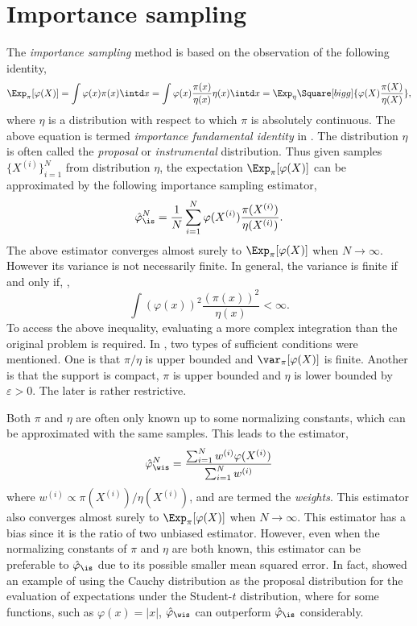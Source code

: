 \section{Importance sampling}
\label{sec:Importance sampling}

The \emph{importance sampling} method is based on the observation of the
following identity,
\begin{equation}
  \Exp_{\pi}[\varphi(X)]
  = \int\varphi(x)\pi(x)\intd x
  = \int\varphi(x)\frac{\pi(x)}{\eta(x)}\eta(x)\intd x
  = \Exp_{\eta}\Square[bigg]{\varphi(X)\frac{\pi(X)}{\eta(X)}},
  \label{eq:impotance fundamental}
\end{equation}
where $\eta$ is a distribution with respect to which $\pi$ is absolutely
continuous. The above equation is termed \emph{importance fundamental
  identity} in \cite{Robert:2004tn}. The distribution $\eta$ is often called
the \emph{proposal} or \emph{instrumental} distribution. Thus given \iid
samples $\{X^{(i)}\}_{i=1}^N$ from distribution $\eta$, the expectation
$\Exp_{\pi}[\varphi(X)]$ can be approximated by the following importance
sampling estimator,
\begin{equation}
  \hat\varphi_{\is}^N
  = \frac{1}{N}\sum_{i=1}^N\varphi(X^{(i)})\frac{\pi(X^{(i)})}{\eta(X^{(i)})}.
  \label{eq:is normalized}
\end{equation}
The above estimator converges almost surely to $\Exp_{\pi}[\varphi(X)]$ when
$N\to\infty$. However its variance is not necessarily finite. In general, the
variance is finite if and only if, \cite[][sec.~3.3.2]{Robert:2004tn},
\begin{equation}
  \int(\varphi(x))^2\frac{(\pi(x))^2}{\eta(x)} < \infty.
\end{equation}
To access the above inequality, evaluating a more complex integration than the
original problem is required. In \cite{Geweke:1989tm}, two types of sufficient
conditions were mentioned. One is that $\pi/\eta$ is upper bounded and
$\var_{\pi}[\varphi(X)]$ is finite. Another is that the support is compact,
$\pi$ is upper bounded and $\eta$ is lower bounded by $\varepsilon > 0$. The
later is rather restrictive.

Both $\pi$ and $\eta$ are often only known up to some normalizing constants,
which can be approximated with the same samples. This leads to the estimator,
\begin{equation}
  \hat\varphi_{\wis}^N
  = \frac{\sum_{i=1}^Nw^{(i)}\varphi(X^{(i)})}{\sum_{i=1}^Nw^{(i)}}
  \label{eq:is unnormalized}
\end{equation}
where $w^{(i)} \propto \pi(X^{(i)})/\eta(X^{(i)})$, and are termed the
\emph{weights}. This estimator also converges almost surely to
$\Exp_{\pi}[\varphi(X)]$ when $N\to\infty$. This estimator has a bias since it
is the ratio of two unbiased estimator. However, even when the normalizing
constants of $\pi$ and $\eta$ are both known, this estimator can be preferable
to $\hat\varphi_{\is}$ due to its possible smaller mean squared error. In
fact, \cite{Casella:1998tj} showed an example of using the Cauchy distribution
as the proposal distribution for the evaluation of expectations under the
Student-$t$ distribution, where for some functions, such as $\varphi(x) =
|x|$, $\hat\varphi_{\wis}$ can outperform $\hat\varphi_{\is}$ considerably.

